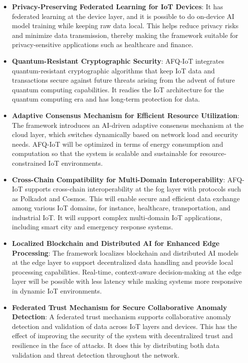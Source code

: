 \documentclass[12pt, oneside]{report}
\begin{document}
\begin{itemize}

    \item \textbf{Privacy-Preserving Federated Learning for IoT Devices}: 
    It has federated learning at the device layer, and it is possible to do on-device AI model training while keeping raw data local. This helps reduce privacy risks and minimize data transmission, thereby making the framework suitable for privacy-sensitive applications such as healthcare and finance.

    \item \textbf{Quantum-Resistant Cryptographic Security}: 
    AFQ-IoT integrates quantum-resistant cryptographic algorithms that keep IoT data and transactions secure against future threats arising from the advent of future quantum computing capabilities. It readies the IoT architecture for the quantum computing era and has long-term protection for data.

    \item \textbf{Adaptive Consensus Mechanism for Efficient Resource Utilization}: 
    The framework introduces an AI-driven adaptive consensus mechanism at the cloud layer, which switches dynamically based on network load and security needs. AFQ-IoT will be optimized in terms of energy consumption and computation so that the system is scalable and sustainable for resource-constrained IoT environments.

    \item \textbf{Cross-Chain Compatibility for Multi-Domain Interoperability}: 
   AFQ-IoT supports cross-chain interoperability at the fog layer with protocols such as Polkadot and Cosmos. This will enable secure and efficient data exchange among various IoT domains, for instance, healthcare, transportation, and industrial IoT. It will support complex multi-domain IoT applications, including smart city and emergency response systems.

    \item \textbf{Localized Blockchain and Distributed AI for Enhanced Edge Processing}: 
    The framework localizes blockchain and distributed AI models at the edge layer to support decentralized data handling and provide local processing capabilities. Real-time, context-aware decision-making at the edge layer will be possible with less latency while making systems more responsive in dynamic IoT environments.

    \item \textbf{Federated Trust Mechanism for Secure Collaborative Anomaly Detection}: 
    A federated trust mechanism supports collaborative anomaly detection and validation of data across IoT layers and devices. This has the effect of improving the security of the system with decentralized trust and resilience in the face of attacks. It does this by distributing both data validation and threat detection throughout the network.


\end{itemize}
\end{document}
